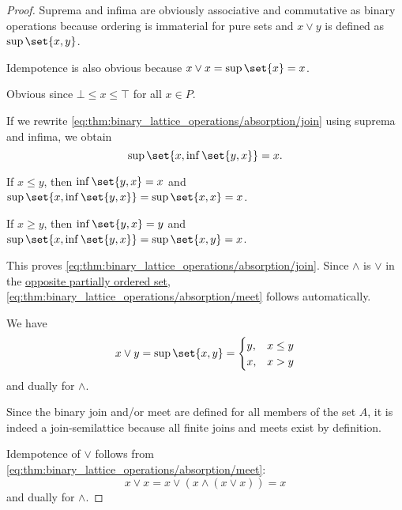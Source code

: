 \begin{proof}
   Suprema and infima are obviously associative and commutative as binary operations because ordering is immaterial for pure sets and \( x \vee y \) is defined as \( \sup\set{ x, y } \).

  Idempotence is also obvious because \( x \vee x = \sup\set{ x } = x \).

   Obvious since \( \bot \leq x \leq \top \) for all \( x \in P \).

   If we rewrite \eqref{eq:thm:binary_lattice_operations/absorption/join} using suprema and infima, we obtain
  \begin{equation*}
    \sup\set{ x, \inf\set{ y, x } } = x.
  \end{equation*}

  If \( x \leq y \), then \( \inf\set{ y, x } = x \) and \( \sup\set{ x, \inf\set{ y, x } } = \sup\set{ x, x } = x \).

  If \( x \geq y \), then \( \inf\set{ y, x } = y \) and \( \sup\set{ x, \inf\set{ y, x } } = \sup\set{ x, y } = x \).

  This proves \eqref{eq:thm:binary_lattice_operations/absorption/join}. Since \( \wedge \) is \( \vee \) in the \hyperref[def:preordered_set/opposite]{opposite partially ordered set}, \eqref{eq:thm:binary_lattice_operations/absorption/meet} follows automatically.

   We have
  \begin{equation*}
    x \vee y
    =
    \sup\set{ x, y }
    =
    \begin{cases}
      y, &x \leq y \\
      x, &x > y
    \end{cases}
  \end{equation*}
  and dually for \( \wedge \).

   Since the binary join and/or meet are defined for all members of the set \( A \), it is indeed a join-semilattice because all finite joins and meets exist by definition.

  Idempotence of \( \vee \) follows from \eqref{eq:thm:binary_lattice_operations/absorption/meet}:
  \begin{equation*}
    x \vee x = x \vee (x \wedge (x \vee x)) = x
  \end{equation*}
  and dually for \( \wedge \).
\end{proof}


